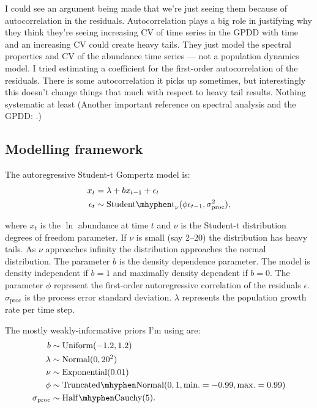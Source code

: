 \documentclass[10pt]{article}
\begin{document}
I could see an argument being made that we're just seeing them because of autocorrelation in the residuals. Autocorrelation plays a big role in \citet{inchausti2002} justifying why they think they're seeing increasing CV of time series in the GPDD with time and an increasing CV could create heavy tails. They just model the spectral properties and CV of the abundance time series --- not a population dynamics model. I tried estimating a coefficient for the first-order autocorrelation of the residuals. There is some autocorrelation it picks up sometimes, but interestingly this doesn't change things that much with respect to heavy tail results. Nothing systematic at least (Another important reference on spectral analysis and the GPDD: \citet{garcia-carreras2011}.)


\subsection*{Modelling framework}

The autoregressive Student-t Gompertz model is:
\begin{align*}
x_t &= \lambda + b x_{t-1} + \epsilon_t\\
\epsilon_t &\sim \mathrm{Student\mhyphen t}_\nu(\phi \epsilon_{t-1}, \sigma_\mathrm{proc}^2),
\end{align*}

\noindent where $x_t$ is the $\ln$ abundance at time $t$ and $\nu$ is the Student-t distribution degrees of freedom parameter. If $\nu$ is small (say 2--20) the distribution has heavy tails. As $\nu$ approaches infinity the distribution approaches the normal distribution. The parameter $b$ is the density dependence parameter. The model is density independent if $b = 1$ and maximally density dependent if $b = 0$. The parameter $\phi$ represent the first-order autoregressive correlation of the residuals $\epsilon$. $\sigma_\mathrm{proc}$ is the process error standard deviation. $\lambda$ represents the population growth rate per time step.

The mostly weakly-informative priors I'm using are:
\begin{align*}
b &\sim \mathrm{Uniform}(-1.2, 1.2)\\
\lambda &\sim \mathrm{Normal}(0, 20^2)\\
\nu &\sim \mathrm{Exponential}(0.01)\\
\phi &\sim \mathrm{Truncated\mhyphen Normal}(0, 1, \mathrm{min.} = -0.99, \mathrm{max.} = 0.99)\\
\sigma_\mathrm{proc} &\sim \mathrm{Half\mhyphen Cauchy} (5).
\end{align*}
\end{document}
